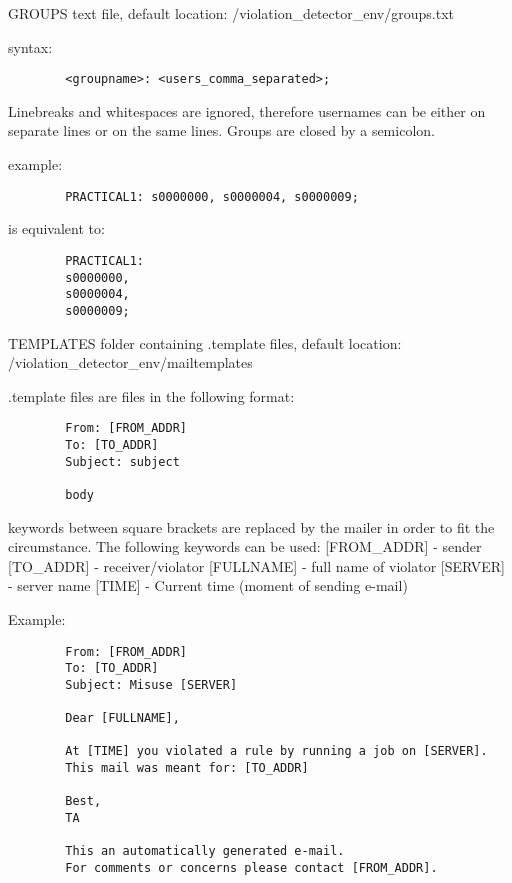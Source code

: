 \documentclass[10pt]{article}
\begin{document}
GROUPS
text file, default location: /violation\_detector\_env/groups.txt
        
syntax:
\begin{verbatim}
        <groupname>: <users_comma_separated>;
\end{verbatim}
Linebreaks and whitespaces are ignored, therefore usernames can 
be either on separate lines or on the same lines. Groups are
closed by a semicolon.
        
example:
\begin{verbatim}
        PRACTICAL1: s0000000, s0000004, s0000009;
\end{verbatim}
is equivalent to:
\begin{verbatim}
        PRACTICAL1: 
        s0000000,
        s0000004,
        s0000009;
\end{verbatim}
        

TEMPLATES
folder containing .template files,
default location: /violation\_detector\_env/mailtemplates
        
.template files are files in the following format:
\begin{verbatim}
        From: [FROM_ADDR]
        To: [TO_ADDR]
        Subject: subject
        
        body
\end{verbatim}
        
keywords between square brackets are replaced by the mailer
in order to fit the circumstance. The following keywords can be used: 
[FROM\_ADDR]     - sender 
[TO\_ADDR]       - receiver/violator 
[FULLNAME]      - full name of violator 
[SERVER]        - server name 
[TIME]          - Current time (moment of sending e-mail) 

Example:
\begin{verbatim}
        From: [FROM_ADDR]
        To: [TO_ADDR]
        Subject: Misuse [SERVER]

        Dear [FULLNAME],

        At [TIME] you violated a rule by running a job on [SERVER]. 
        This mail was meant for: [TO_ADDR]

        Best,
        TA
        
        This an automatically generated e-mail.
        For comments or concerns please contact [FROM_ADDR].
\end{verbatim}
\end{document}
